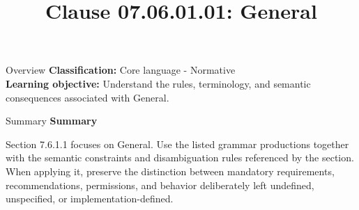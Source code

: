 \documentclass[10pt,letterpaper]{article}
\title{Clause 07.06.01.01: General}
\author{}
\date{}
\begin{document}
\maketitle
\begin{CornellOverviewBox}{Overview}
\textbf{Classification:} Core language - Normative\\[2pt]
\textbf{Learning objective:} Understand the rules, terminology, and semantic consequences associated with General.
\end{CornellOverviewBox}\begin{CornellSummaryBox}{Summary}
{\sffamily\bfseries\color{Accent} Summary}\par\vspace{3pt}Section 7.6.1.1 focuses on General. Use the listed grammar productions together with the semantic constraints and disambiguation rules referenced by the section. When applying it, preserve the distinction between mandatory requirements, recommendations, permissions, and behavior deliberately left undefined, unspecified, or implementation-defined.
\end{CornellSummaryBox}
\end{document}
